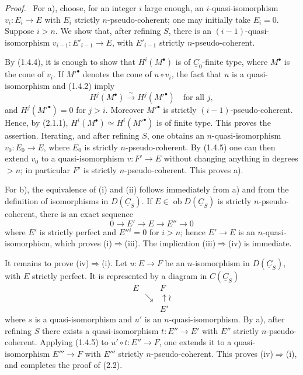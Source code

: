 \documentclass[13pt]{extarticle}
\newcommand{\uC}{\underline C}
\newcommand{\ob}{\operatorname{ob}}
\newcommand{\iso}{\xrightarrow{\sim}}
\newenvironment{prooftext}[1][Proof]{\par\noindent\emph{#1.}\ }{\par\medskip}
\begin{document}
\begin{prooftext}
For a), choose, for an integer $i$ large enough, an $i$-quasi-isomorphism $v_i:E_i\to E$ with $E_i$ strictly $n$-pseudo-coherent; one may initially take $E_i=0$. Suppose $i>n$. We show that, after refining $S$, there is an $(i-1)$-quasi-isomorphism $v_{i-1}:E'_{i-1}\to E$, with $E'_{i-1}$ strictly $n$-pseudo-coherent.

By (1.4.4), it is enough to show that $H^i(M^\bullet)$ is of $\uC_0$-finite type, where $M^\bullet$ is the cone of $v_i$. If $M'^\bullet$ denotes the cone of $u\circ v_i$, the fact that $u$ is a quasi-isomorphism and (1.4.2) imply
\[
H^j(M^\bullet)\iso H^j(M'^\bullet)\quad\text{for all }j,
\]
and $H^j(M'^\bullet)=0$ for $j>i$. Moreover $M'^\bullet$ is strictly $(i-1)$-pseudo-coherent. Hence, by (2.1.1), $H^i(M^\bullet)\simeq H^i(M'^\bullet)$ is of finite type. This proves the assertion. Iterating, and after refining $S$, one obtains an $n$-quasi-isomorphism $v_0:E_0\to E$, where $E_0$ is strictly $n$-pseudo-coherent. By (1.4.5) one can then extend $v_0$ to a quasi-isomorphism $v:F'\to E$ without changing anything in degrees $>n$; in particular $F'$ is strictly $n$-pseudo-coherent. This proves a).

For b), the equivalence of (i) and (ii) follows immediately from a) and from the definition of isomorphisms in $D(\uC_S)$. If $E\in\ob D(\uC_S)$ is strictly $n$-pseudo-coherent, there is an exact sequence
\[
0\longrightarrow E'\longrightarrow E\longrightarrow E''\longrightarrow0
\]
where $E'$ is strictly perfect and $E''{}^i=0$ for $i>n$; hence $E'\to E$ is an $n$-quasi-isomorphism, which proves (i)$\Rightarrow$(iii). The implication (iii)$\Rightarrow$(iv) is immediate.

It remains to prove (iv)$\Rightarrow$(i). Let $u:E\to F$ be an $n$-isomorphism in $D(\uC_S)$, with $E$ strictly perfect. It is represented by a diagram in $C(\uC_S)$
\[
\begin{array}{ccc}
E && F\\
& \searrow & \uparrow\wr\\
&& E'
\end{array}
\]
where $s$ is a quasi-isomorphism and $u'$ is an $n$-quasi-isomorphism. By a), after refining $S$ there exists a quasi-isomorphism $t:E''\to E'$ with $E''$ strictly $n$-pseudo-coherent. Applying (1.4.5) to $u'\circ t:E''\to F$, one extends it to a quasi-isomorphism $E'''\to F$ with $E'''$ strictly $n$-pseudo-coherent. This proves (iv)$\Rightarrow$(i), and completes the proof of (2.2).
\end{prooftext}
\end{document}
